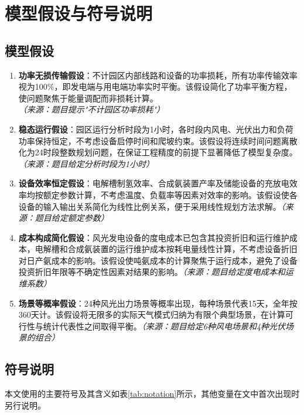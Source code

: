 \section{模型假设与符号说明}

\subsection{模型假设}

\begin{enumerate}
    \item \textbf{功率无损传输假设}：不计园区内部线路和设备的功率损耗，所有功率传输效率视为100\%，即发电端与用电端功率实时平衡。该假设简化了功率平衡方程，使问题聚焦于能量调配而非损耗计算。\textit{（来源：题目提示"不计园区功率损耗"）}
    
    \item \textbf{稳态运行假设}：园区运行分析时段为1小时，各时段内风电、光伏出力和负荷功率保持恒定，不考虑设备启停时间和爬坡约束。该假设将连续时间问题离散化为24时段整数规划问题，在保证工程精度的前提下显著降低了模型复杂度。\textit{（来源：题目给定分析时段为1小时）}
    
    \item \textbf{设备效率恒定假设}：电解槽制氢效率、合成氨装置产率及储能设备的充放电效率均按额定参数计算，不考虑温度、负载率等因素对效率的影响。该假设使各设备的输入输出关系简化为线性比例关系，便于采用线性规划方法求解。\textit{（来源：题目给定额定参数）}
    
    \item \textbf{成本构成简化假设}：风光发电设备的度电成本已包含其投资折旧和运行维护成本，电解槽和合成氨装置的运行维护成本按耗电量线性计算，不考虑设备折旧对日产氨成本的影响。该假设使吨氨成本的计算聚焦于运行成本，避免了设备投资折旧年限等不确定性因素对结果的影响。\textit{（来源：题目给定度电成本和运维系数）}
    
    \item \textbf{场景等概率假设}：24种风光出力场景等概率出现，每种场景代表15天，全年按360天计。该假设将无限多的实际天气模式归纳为有限个典型场景，在计算可行性与统计代表性之间取得平衡。\textit{（来源：题目给定6种风电场景和4种光伏场景的组合）}
\end{enumerate}

\subsection{符号说明}

本文使用的主要符号及其含义如表\ref{tab:notation}所示，其他变量在文中首次出现时另行说明。

